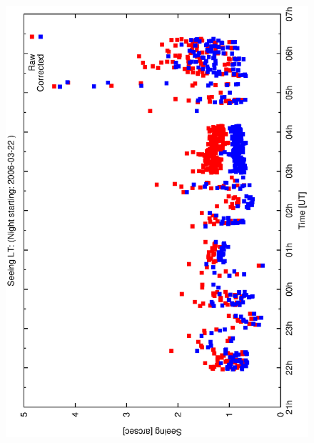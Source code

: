{{\begin{figure}[htbp]
\begin{center}
{    \includegraphics[scale=0.25, angle=-90]{figures/ecs/see_profile_2006_03_22.eps}
    \label{fig:see_profile_2006_03_22}
  }
\end{center}
\end{figure}}}
